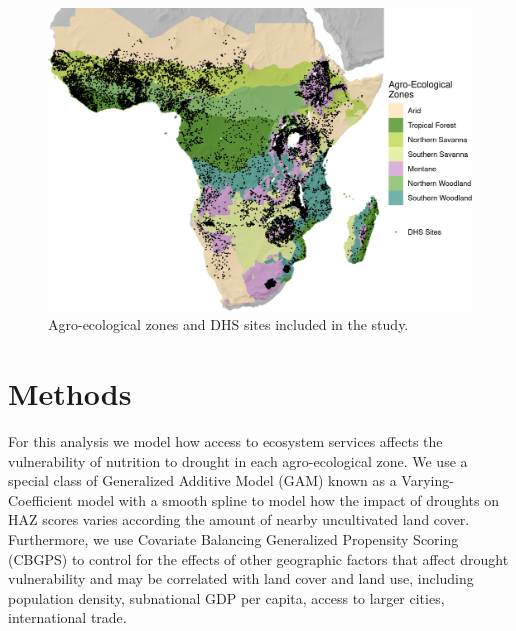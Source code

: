 \documentclass[titlepage]{article}
\begin{document}
\begin{figure}[h]
	\centering
	\includegraphics[width=0.8\linewidth]{AEZ_Sites.png}
	\caption{Agro-ecological zones and DHS sites included in the study.}
	\label{fig:AEZmap}
\end{figure}

\section{Methods}
For this analysis we model how access to ecosystem services affects the vulnerability of nutrition to drought in each agro-ecological zone.  We use a special class of Generalized Additive Model (GAM) known as a Varying-Coefficient model \citep{Wood2017} with a smooth spline to model how the impact of droughts on HAZ scores varies according the amount of nearby uncultivated land cover.  Furthermore, we use Covariate Balancing Generalized Propensity Scoring (CBGPS) \citep{imai2014covariate} to control for the effects of other geographic factors that affect drought vulnerability and may be correlated with land cover and land use, including population density, subnational GDP per capita, access to larger cities, international trade.
\end{document}
